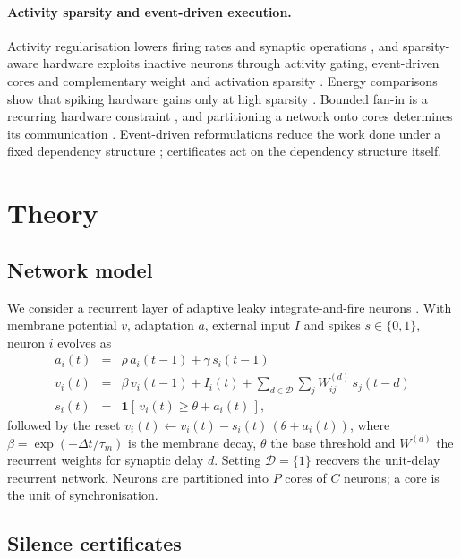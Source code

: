 \documentclass{iopjournal}
\begin{document}
\paragraph{Activity sparsity and event-driven execution.} Activity regularisation lowers firing rates and synaptic operations \cite{sorbaro2020,narduzzi2025,stanojevic2024}, and sparsity-aware hardware exploits inactive neurons through activity gating, event-driven cores and complementary weight and activation sparsity \cite{reeb2026,speck,hunter2022}. Energy comparisons show that spiking hardware gains only at high sparsity \cite{dampfhoffer2023}. Bounded fan-in is a recurring hardware constraint \cite{petschenig2023,dynapse2}, and partitioning a network onto cores determines its communication \cite{lober}. Event-driven reformulations reduce the work done under a fixed dependency structure \cite{eprop,paralif}; certificates act on the dependency structure itself.

\section{Theory}

\subsection{Network model}
\label{sec:model}

We consider a recurrent layer of adaptive leaky integrate-and-fire neurons \cite{lsnn,asrnn}. With membrane potential $v$, adaptation $a$, external input $I$ and spikes $s\in\{0,1\}$, neuron $i$ evolves as
\begin{eqnarray}
a_i(t) &=& \rho\, a_i(t-1) + \gamma\, s_i(t-1) \\
v_i(t) &=& \beta\, v_i(t-1) + I_i(t) + \sum_{d\in\mathcal{D}} \sum_j W^{(d)}_{ij}\, s_j(t-d) \\
s_i(t) &=& \mathbf{1}\!\left[\, v_i(t) \ge \theta + a_i(t) \,\right],
\end{eqnarray}
followed by the reset $v_i(t) \leftarrow v_i(t) - s_i(t)\,(\theta + a_i(t))$, where $\beta=\exp(-\Delta t/\tau_m)$ is the membrane decay, $\theta$ the base threshold and $W^{(d)}$ the recurrent weights for synaptic delay $d$. Setting $\mathcal{D}=\{1\}$ recovers the unit-delay recurrent network. Neurons are partitioned into $P$ cores of $C$ neurons; a core is the unit of synchronisation.

\subsection{Silence certificates}
\label{sec:certs}
\end{document}
